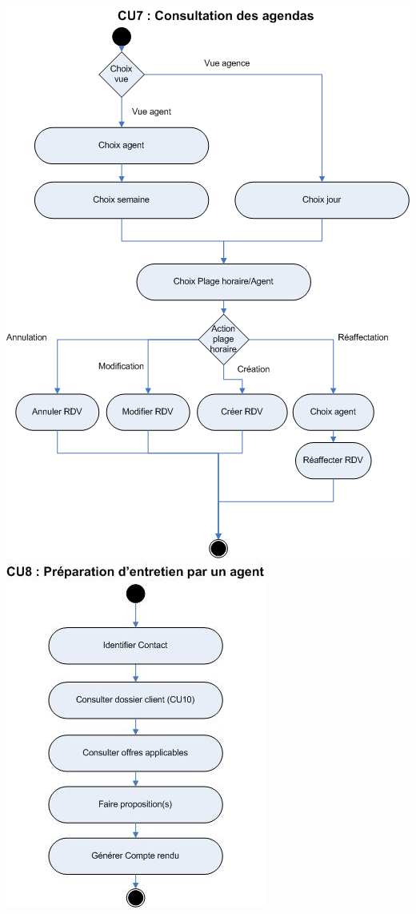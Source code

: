 \begin {center}
\includegraphics[width=\textwidth]{../../diagrammeActivite/DACU7.png}
\includegraphics[width=\textwidth]{../../diagrammeActivite/DACU8.jpg}

\end{center}
